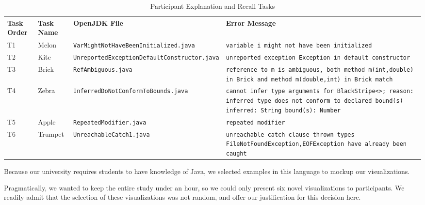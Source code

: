 \documentclass[conference]{IEEEtran}
\begin{document}
\begin{table}[!t]
\caption{Participant Explanation and Recall Tasks\label{tab:tasks}}
\centering
\begin{tabularx}{\textwidth}{lllX}
\toprule
Task Order & Task Name & OpenJDK File & Error Message\\
\midrule

T1 & Melon & \texttt{VarMightNotHaveBeenInitialized.java} & \texttt{variable i might not have been initialized} \\
[0.2cm]
\midrule

T2 & Kite & \texttt{UnreportedExceptionDefaultConstructor.java} & \texttt{unreported exception Exception in default constructor} \\
[0.2cm]
\midrule

T3 & Brick & \texttt{RefAmbiguous.java} & \texttt{reference to m is ambiguous, both method m(int,double) in Brick and method m(double,int) in Brick match}\\
[0.2cm]
\midrule

T4 & Zebra & \texttt{InferredDoNotConformToBounds.java} & \texttt{cannot infer type arguments for BlackStripe<>;\newline
reason: inferred type does not conform to declared bound(s)\newline\newline
inferred: String\newline
    bound(s): Number}\\
[0.2cm]
\midrule

T5 & Apple & \texttt{RepeatedModifier.java} & \texttt{repeated modifier
}\\
[0.2cm]
\midrule

T6 & Trumpet & \texttt{UnreachableCatch1.java} & \texttt{unreachable catch clause\newline     
  thrown types FileNotFoundException,EOFException have already been caught
}\\
[0.2cm]

\bottomrule
\end{tabularx}
\end{table}

Because our university requires students to have knowledge of Java, we selected examples in this language to mockup our visualizations.

Pragmatically, we wanted to keep the entire study under an hour, so we could only present six novel visualizations to participants. We readily admit that the selection of these visualizations was not random, and offer our justification for this decision here. 
\end{document}
